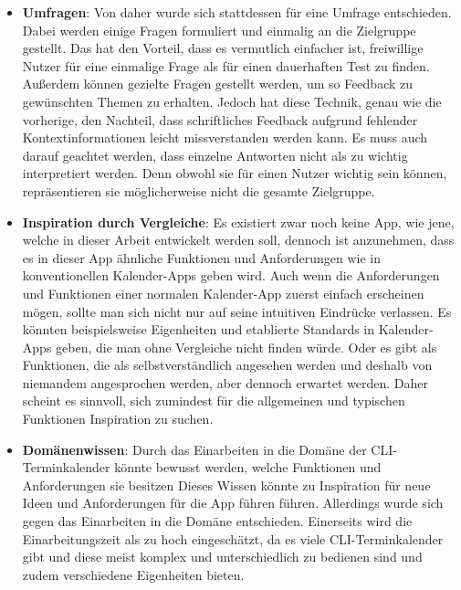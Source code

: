 \begin{itemize}
	\item \textbf{Umfragen}: %
	Von daher wurde sich stattdessen für eine Umfrage entschieden. Dabei werden einige Fragen formuliert und einmalig an die Zielgruppe gestellt. %
	Das hat den Vorteil, dass es vermutlich einfacher ist, freiwillige Nutzer für eine einmalige Frage als für einen dauerhaften Test zu finden. %
	Außerdem können gezielte Fragen gestellt werden, um so Feedback zu gewünschten Themen zu erhalten. %
	Jedoch hat diese Technik, genau wie die vorherige, den Nachteil, dass schriftliches Feedback aufgrund fehlender Kontextinformationen leicht missverstanden werden kann. %
	Es muss auch darauf geachtet werden, dass einzelne Antworten nicht als zu wichtig interpretiert werden. Denn obwohl sie für einen Nutzer wichtig sein können, repräsentieren sie möglicherweise nicht die gesamte Zielgruppe.%
	\item \textbf{Inspiration durch Vergleiche}: %
		Es existiert zwar noch keine App, wie jene, welche in dieser Arbeit entwickelt werden soll, dennoch ist anzunehmen, dass es in dieser App ähnliche Funktionen und Anforderungen wie in konventionellen Kalender-Apps geben wird. %
		Auch wenn die Anforderungen und Funktionen einer normalen Kalender-App zuerst einfach erscheinen mögen, sollte man sich nicht nur auf seine intuitiven Eindrücke verlassen. %
			Es könnten beispielsweise Eigenheiten und etablierte Standards in Kalender-Apps geben, die man ohne Vergleiche nicht finden würde. Oder es gibt als Funktionen, die als selbstverständlich angesehen werden und deshalb von niemandem angesprochen werden, aber dennoch erwartet werden. %
		Daher scheint es sinnvoll, sich zumindest für die allgemeinen und typischen Funktionen Inspiration zu suchen.%
	\item \textbf{Domänenwissen}: %
		Durch das Einarbeiten in die Domäne der CLI-Terminkalender könnte bewusst werden, welche Funktionen und Anforderungen sie besitzen %
		Dieses Wissen könnte zu Inspiration für neue Ideen und Anforderungen für die App führen führen. %
		Allerdings wurde sich gegen das Einarbeiten in die Domäne entschieden. %
			Einerseits wird die Einarbeitungszeit als zu hoch eingeschätzt, da es viele CLI-Terminkalender gibt und diese meist komplex und unterschiedlich zu bedienen sind und zudem verschiedene Eigenheiten bieten. %

\end{itemize}
